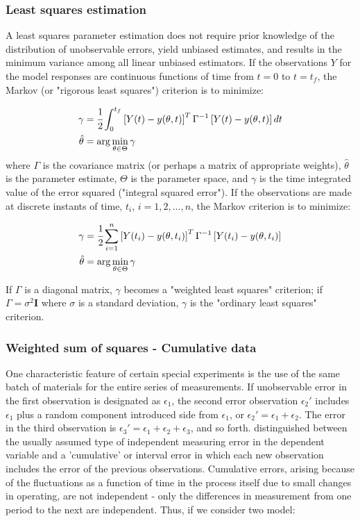 \documentclass[../Article_Model_Parameters.tex]{subfiles}
\begin{document}
\subsubsection{Least squares estimation}
A least squares parameter estimation does not require prior knowledge of the distribution of unobservable errors, yield  unbiased estimates, and results in the minimum variance among all linear unbiased estimators. If the observations $ Y$ for the model responses are continuous functions of time from $t = 0$ to $t = t_f$, the Markov (or "rigorous least squares") criterion is to minimize:

{\footnotesize
	\begin{align}
		\gamma &= \cfrac{1}{2} \int_{0}^{t_f}  \left[ Y(t) - y(\theta,t) \right]^T \Gamma^{-1} \left[ Y(t) - y(\theta,t) \right] dt \\
		\hat{\theta} &= \arg \min_{\theta \in \Theta} \gamma
\end{align} }
where $\Gamma$ is the covariance matrix (or perhaps a matrix of appropriate weights), $\hat{\theta}$ is the parameter estimate, $\Theta$ is the parameter space, and $\gamma$ is the time integrated value of the error squared ("integral squared error"). 
If the observations are made at discrete instants of time, $t_i$, $i = 1,2,...,n$, the Markov criterion is to minimize:

{\footnotesize
	\begin{align}
		\gamma &= \cfrac{1}{2} \sum_{i=1}^{n} \left[ Y(t_i) - y(\theta,t_i) \right]^T \Gamma^{-1} \left[ Y(t_i) - y(\theta,t_i) \right] \\
		\hat{\theta} &= \arg \min_{\theta \in \Theta} \gamma
\end{align} }

If $\Gamma$ is a diagonal matrix, $\gamma$  becomes a "weighted least squares" criterion; if $\Gamma = \sigma^2 \textbf{I}$ where $\sigma$ is a standard deviation, $\gamma$ is the "ordinary least squares" criterion.

\iffalse
\subsubsection{Weighted sum of squares - Cumulative data}

One characteristic feature of certain special experiments is the use of the same batch of materials for the entire series of measurements. If unobservable error in the first observation is designated as $\epsilon_1$, the second error observation $\epsilon_2'$ includes $\epsilon_1$ plus a random component introduced side from $\epsilon_1$, or $\epsilon_2' = \epsilon_1 + \epsilon_2$. The error in the third observation is $\epsilon_3' = \epsilon_1 + \epsilon_2 + \epsilon_3$, and so forth. \citet{Mandel1957} distinguished between the usually assumed type of independent measuring error in the dependent variable and a 'cumulative' or interval error in which each new observation includes the error of the previous observations. Cumulative errors, arising because of the fluctuations as a function of time in the process itself due to small changes in operating, are not independent - only the differences in measurement from one period to the next are independent. Thus, if we consider two model:
\end{document}
